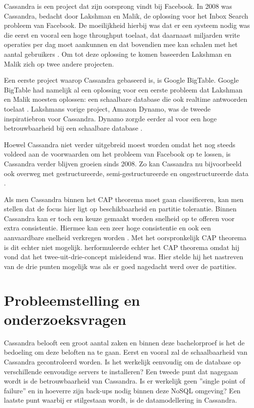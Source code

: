 Cassandra is een project dat zijn oorsprong vindt bij Facebook.
In 2008 was Cassandra, bedacht door Lakshman en Malik, de oplossing voor het Inbox Search probleem van Facebook.
De moeilijkheid hierbij was dat er een systeem nodig was die eerst en vooral een hoge throughput toelaat, dat daarnaast miljarden write operaties per dag moet aankunnen en dat bovendien mee kan schalen met het aantal gebruikers \citep{lakshman2010cassandra}.
Om tot deze oplossing te komen baseerden Lakshman en Malik zich op twee andere projecten.

Een eerste project waarop Cassandra gebaseerd is, is Google BigTable.
Google BigTable had namelijk al een oplossing voor een eerste probleem dat Lakshman en Malik moesten oplossen: een schaalbare database die ook realtime antwoorden toelaat \citep{chang2008bigtable}.
Lakshmans vorige project, Amazon Dynamo, was de tweede inspiratiebron voor Cassandra.
Dynamo zorgde eerder al voor een hoge betrouwbaarheid bij een schaalbare database \citep{decandia2007dynamo}.

Hoewel Cassandra niet verder uitgebreid moest worden omdat het nog steeds voldeed aan de voorwaarden om het probleem van Facebook op te lossen, is Cassandra verder blijven groeien sinds 2008.
Zo kan Cassandra nu bijvoorbeeld ook overweg met gestructureerde, semi-gestructureerde en ongestructureerde data \citep{kan2014cassandra}.

Als men Cassandra binnen het CAP theorema moet gaan classificeren, kan men stellen dat de focus hier ligt op beschikbaarheid en partitie tolerantie.
Binnen Cassandra kan er toch een keuze gemaakt worden snelheid op te offeren voor extra consistentie.
Hiermee kan een zeer hoge consistentie en ook een aanvaardbare snelheid verkregen worden \citep{ellis2009cassandra}.
Met het oorspronkelijk CAP theorema is dit echter niet mogelijk.
\cite{brewer2012cap} herformuleerde echter het CAP theorema omdat hij vond dat het twee-uit-drie-concept misleidend was.
Hier stelde hij het nastreven van de drie punten mogelijk was als er goed nagedacht werd over de partities.

\section{Probleemstelling en onderzoeksvragen}
\label{sec:onderzoeksvragen}


Cassandra belooft een groot aantal zaken en binnen deze bachelorproef is het de bedoeling om deze beloften na te gaan.
Eerst en vooral zal de schaalbaarheid van Cassandra gecontroleerd worden.
Is het werkelijk eenvoudig om de database op verschillende eenvoudige servers te installeren?
Een tweede punt dat nagegaan wordt is de betrouwbaarheid van Cassandra.
Is er werkelijk geen ''single point of failure'' en in hoeverre zijn back-ups nodig binnen deze NoSQL omgeving?
Een laatste punt waarbij er stilgestaan wordt, is de datamodellering in Cassandra.